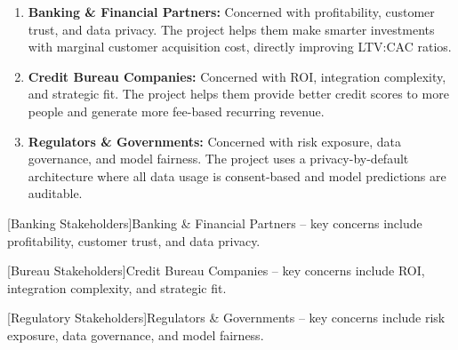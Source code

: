 \begin{enumerate}
    \item \textbf{Banking \& Financial Partners:} Concerned with profitability, customer trust, and data privacy. The project helps them make smarter investments with marginal customer acquisition cost, directly improving LTV:CAC ratios.
    \item \textbf{Credit Bureau Companies:} Concerned with ROI, integration complexity, and strategic fit. The project helps them provide better credit scores to more people and generate more fee-based recurring revenue.
    \item \textbf{Regulators \& Governments:} Concerned with risk exposure, data governance, and model fairness. The project uses a privacy-by-default architecture where all data usage is consent-based and model predictions are auditable.
\end{enumerate}

\begin{center}
\begin{minipage}[t]{0.315\textwidth}
\centering
\begingroup
\setlength{\fboxsep}{\SPFigureFrameSep}%
\setlength{\fboxrule}{2.4pt}%
%
\endgroup
{}[Banking Stakeholders]{Banking \& Financial Partners -- key concerns include profitability, customer trust, and data privacy.}
\label{fig:stakeholders_banking}
\end{minipage}\hfill%
\begin{minipage}[t]{0.315\textwidth}
\centering
{}
[Bureau Stakeholders]{Credit Bureau Companies -- key concerns include \ac{ROI}, integration complexity, and strategic fit.}
\label{fig:stakeholders_bureau}
\end{minipage}\hfill%
\begin{minipage}[t]{0.315\textwidth}
\centering
{}
[Regulatory Stakeholders]{Regulators \& Governments -- key concerns include risk exposure, data governance, and model fairness.}
\label{fig:stakeholders_regulators}
\end{minipage}
\end{center}

\FloatBarrier



